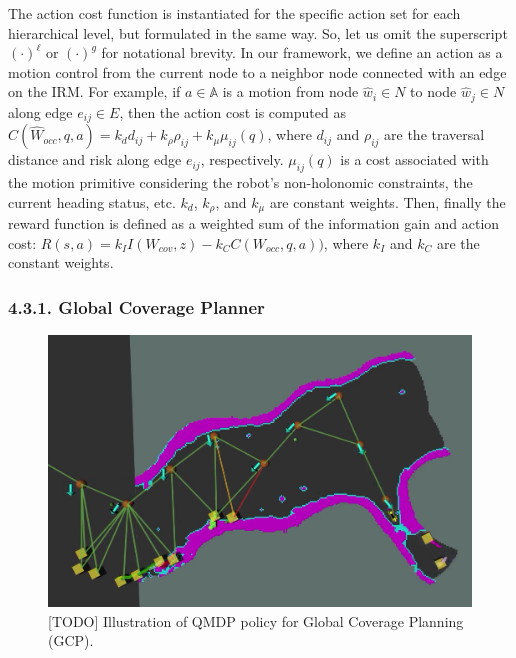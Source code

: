 \documentclass[letterpaper]{article} %
\newcommand{\phdone}[1]{} %
\begin{document}


\phdone{Reward Function--Action Cost}
The action cost function is instantiated for the specific action set for each hierarchical level, but formulated in the same way.
So, let us omit the superscript $(\cdot)^\ell$ or $(\cdot)^g$ for notational brevity.
In our framework, we define an action as a motion control from the current node to a neighbor node connected with an edge on the IRM.
For example, if $a \in \mathbb{A}$ is a motion from node $\hat{w}_i \in N$ to node $\hat{w}_j \in N$ along edge $e_{ij} \in E$, then the action cost is computed as
$C(\hat{W}_{occ}, q, a) = k_d d_{ij} + k_\rho \rho_{ij} + k_\mu \mu_{ij}(q)$,
where $d_{ij}$ and $\rho_{ij}$ are the traversal distance and risk along edge $e_{ij}$, respectively.
$\mu_{ij}(q)$ is a cost associated with the motion primitive considering the robot's non-holonomic constraints, the current heading status, etc.
$k_d$, $k_\rho$, and $k_\mu$ are constant weights.
Then, finally the reward function is defined as a weighted sum of the information gain and action cost:
$R(s, a) = k_I I(W_{cov}, z) - k_C C(W_{occ}, q, a))$,
where $k_I$ and $k_C$ are the constant weights.



\subsubsection{4.3.1. Global Coverage Planner} \label{sssec:GCP}
\begin{figure}[t!]
  \centering
  \includegraphics[width=0.8\columnwidth]{figures/QMDP-for-GLP.png}
  \caption{[TODO] Illustration of QMDP policy for Global Coverage Planning (GCP).}
  \label{fig:graph-level-planner}
\end{figure}
\end{document}
